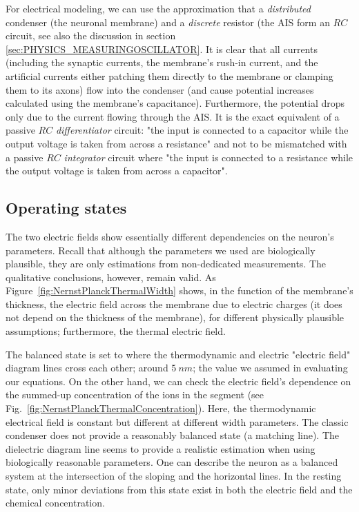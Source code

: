 For electrical modeling, we can use the approximation that a \textit{distributed} condenser
(the neuronal membrane) and a \textit{discrete} resistor (the 
AIS form an $RC$ circuit,
see also the discussion in section \ref{sec:PHYSICS_MEASURINGOSCILLATOR}.
It is clear that all currents (including the synaptic currents, the membrane's rush-in current,
and the artificial currents either patching them directly to the membrane or clamping them to its axons)
flow into the condenser (and cause potential increases calculated using the membrane's capacitance).
Furthermore, the potential drops only due to the current flowing through the 
AIS.
It is the exact equivalent of
 a passive $RC$ \textit{differentiator} circuit:
"the input is connected to a capacitor while the output voltage is taken from across a resistance"
and not to be mismatched with
a passive $RC$ \textit{integrator} circuit
where "the input is connected to a resistance while the output voltage is taken from across a capacitor".


\subsection[States]{Operating states\label{sec:PHYSICS_STATES}}

The two electric fields show essentially different dependencies on the neuron's parameters.
Recall that although the parameters we used are biologically plausible,
they are only estimations from non-dedicated measurements.
The qualitative conclusions, however, remain valid.
As Figure~\ref{fig:NernstPlanckThermalWidth} shows, in the function of the membrane's thickness,
the electric field across the membrane due to electric charges
(it does not depend on the thickness of the membrane), for different physically plausible assumptions;
furthermore, the thermal electric field.

The balanced state is set to where the thermodynamic and electric "electric field" diagram lines cross each other; 
around $5\ nm$; the value we assumed in evaluating our equations.  
On the other hand, we can check the electric field's dependence on the summed-up concentration of the ions in the segment (see Fig.~\ref{fig:NernstPlanckThermalConcentration}).
Here, the thermodynamic electrical field is constant but different at different width parameters. The classic condenser does not provide a reasonably balanced state (a matching line). The dielectric diagram line seems to provide a realistic estimation 
when using biologically reasonable parameters. 
One can describe the neuron as a balanced system at the intersection of the sloping and the horizontal lines. In the resting state, only minor deviations from this state exist
in both the electric field and the chemical concentration.


